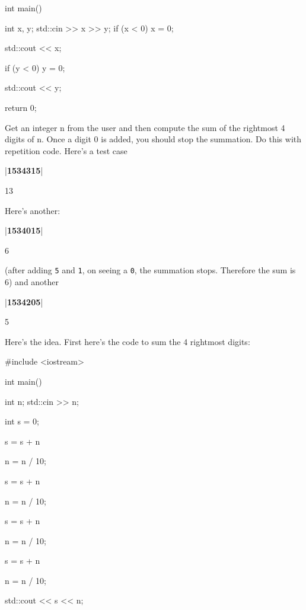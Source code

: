 \begin{ex}
\begin{consolethree}
\begin{ex}
\begin{console}
int main()
{
    int x, y;
    std::cin >> x >> y;
    if (x < 0)
    {
        x = 0;
    }

    std::cout << x;

    if (y < 0)
    {
        y = 0;
    }
    
    std::cout << y;

    return 0;
} 
\end{console}
\end{ex}

\begin{ex}   
Get an integer n from the user and then compute the
sum of the rightmost 4 digits of n. Once a digit 0 is added, you should
stop the summation. Do this with repetition code. Here's a test case

\begin{consolethree}[escapeinside=||]
|\textbf{1534315}|

13 
\end{consolethree}


Here's another:

\begin{consolethree}[escapeinside=||]
|\textbf{1534015}|

6 
\end{consolethree}


(after adding \texttt{5} and \texttt{1}, on seeing a \texttt{0}, the summation
stops. Therefore the sum is 6) and another


\begin{consolethree}[escapeinside=||]
|\textbf{1534205}|

5 
\end{consolethree}

Here's the idea. First here's the code to sum the 4 rightmost digits:

\begin{console}
#include <iostream>

int main()
{
    int n;
    std::cin >> n;

    int s = 0;

    s = s + n %

    n = n / 10;

    s = s + n %

    n = n / 10;

    s = s + n %

    n = n / 10;

    s = s + n %

    n = n / 10;

    std::cout << s << n;

}
\end{console}
\end{ex}
\end{consolethree}
\end{ex}

